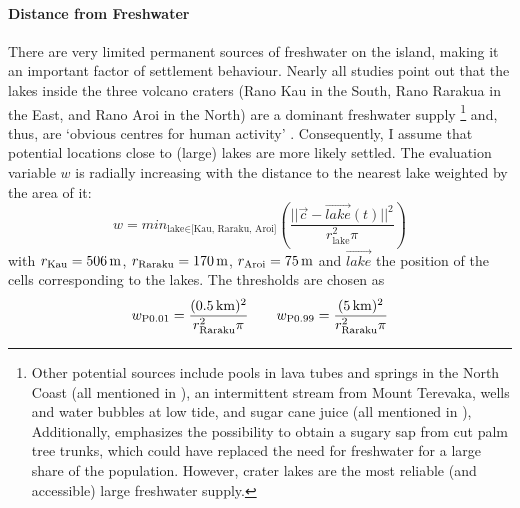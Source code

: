 \paragraph{Distance from Freshwater}
There are very limited permanent sources of freshwater on the island, making it an important factor of settlement behaviour. 
Nearly all studies point out that the lakes inside the three volcano craters (Rano Kau in the South, Rano Rarakua in the East, and Rano Aroi in the North) are a dominant freshwater supply
\footnote{Other potential sources include pools in lava tubes and springs in the North Coast (all mentioned in \citet{Bahn2017}), an intermittent stream from Mount Terevaka, wells and water bubbles at low tide, and sugar cane juice (all mentioned in \citep{Diamond2011}), 
Additionally, \citet{Mieth2015} emphasizes the possibility to obtain a sugary sap from cut palm tree trunks, which could have replaced the need for freshwater for a large share of the population.
However, crater lakes are the most reliable (and accessible) large freshwater supply.}
and, thus, are `obvious centres for human activity' \citep{Bahn2017}.
Consequently, I assume that potential locations close to (large) lakes are more likely settled.
The evaluation variable $w$ is radially increasing with the distance to the nearest lake weighted by the area of it:
\begin{equation}
	w = min_{\text{lake}\in \text{[Kau, Raraku, Aroi]}} \left( \frac{||
		 \vec{c}- \vec{lake}(t)||^2}{r_\text{lake}^2\pi} \right)
\end{equation}
with $r_\text{Kau} = 506\, \rm{m}$, $r_\text{Raraku} = 170\, \rm{m}$, $r_\text{Aroi} = 75\, \rm{m}$ and $\vec{lake}$ the position of the cells corresponding to the lakes.
The thresholds are chosen as 
\begin{equation}
w_{\rm P0.01} = \frac{(0.5\, {\rm km})^2}{r_\text{Raraku}^2\pi} \qquad
 w_{\rm P0.99}=\frac{(5\, {\rm km})^2}{r_\text{Raraku}^2\pi}
\end{equation} 
